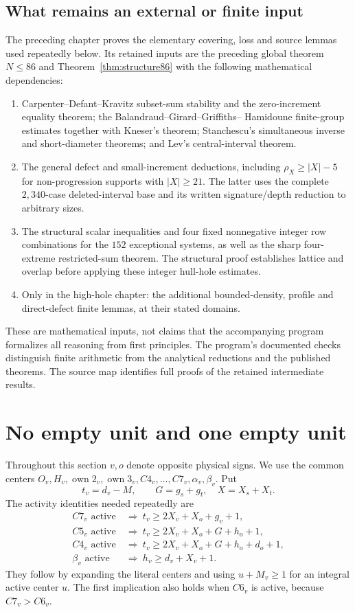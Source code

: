 \documentclass[11pt,letterpaper]{article}
\newcommand{\own}{\operatorname{own}}
\theoremstyle{definition}\newtheorem{definition}[theorem]{Definition}
\begin{document}
\subsection{What remains an external or finite input}
The preceding chapter proves the elementary covering, loss and source
lemmas used repeatedly below. Its retained inputs are the preceding
global theorem $N\le86$ and Theorem~\ref{thm:structure86} with the
following mathematical dependencies:
\begin{enumerate}
\item Carpenter--Defant--Kravitz subset-sum stability and the
zero-increment equality theorem; the Balandraud--Girard--Griffiths--
Hamidoune finite-group estimates together with Kneser's theorem;
Stanchescu's simultaneous inverse and short-diameter theorems; and
Lev's central-interval theorem.
\item The general defect and small-increment deductions, including
$\rho_X\ge |X|-5$ for non-progression supports with $|X|\ge21$.
The latter uses the complete $2{,}340$-case deleted-interval base
and its written signature/depth reduction to arbitrary sizes.
\item The structural scalar inequalities and four fixed nonnegative
integer row combinations for the $152$ exceptional systems, as well
as the sharp four-extreme restricted-sum theorem. The structural
proof establishes lattice and overlap before applying these integer
hull-hole estimates.
\item Only in the high-hole chapter: the additional bounded-density,
profile and direct-defect finite lemmas, at their stated domains.
\end{enumerate}
These are mathematical inputs, not claims that the accompanying
program formalizes all reasoning from first principles. The program's
documented checks distinguish finite arithmetic from the analytical
reductions and the published theorems. The source map identifies full
proofs of the retained intermediate results.


\section{No empty unit and one empty unit}\label{sec:easy}
Throughout this section $v,o$ denote opposite physical signs. We use the common centers $O_v,H_v,\own2_v,\own3_v,C4_v,\ldots,C7_v,\alpha_v,\beta_v$. Put
\[
t_v=d_v-M,\qquad G=g_s+g_t,\quad X=X_s+X_t.
\]
The activity identities needed repeatedly are
\begin{align}
C7_v\text{ active}&\ \Longrightarrow\ t_v\ge2X_v+X_o+g_v+1,\label{eq:e-c7}\\
C5_v\text{ active}&\ \Longrightarrow\ t_v\ge2X_v+X_o+G+h_o+1,\label{eq:e-c5}\\
C4_v\text{ active}&\ \Longrightarrow\ t_v\ge2X_v+X_o+G+h_o+d_o+1,\label{eq:e-c4}\\
\beta_v\text{ active}&\ \Longrightarrow\ h_v\ge d_v+X_v+1.\label{eq:e-beta}
\end{align}
They follow by expanding the literal centers and using $u+M_v\ge1$ for an integral active center $u$. The first implication also holds when $C6_v$ is active, because $C7_v>C6_v$.
\end{document}
